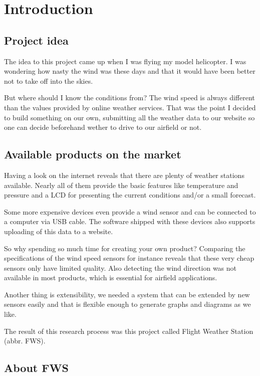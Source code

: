 
\chapter{Introduction}

\section{Project idea}
The idea to this project came up when I was flying my model helicopter. I was wondering how nasty the wind was these days and that it would have been better not to take off into the skies.

But where should I know the conditions from? The wind speed is always different than the values provided by online weather services. That was the point I decided to build something on our own, submitting all the weather data to our website so one can decide beforehand wether to drive to our airfield or not.

\section{Available products on the market}
Having a look on the internet reveals that there are plenty of weather stations available. Nearly all of them provide the basic features like temperature and pressure and a LCD for presenting the current conditions and/or a small forecast.

Some more expensive devices even provide a wind sensor and can be connected to a computer via USB cable. The software shipped with these devices also supports uploading of this data to a website.

So why spending so much time for creating your own product? Comparing the specifications of the wind speed sensors for instance reveals that these very cheap sensors only have limited quality. Also detecting the wind direction was not available in most products, which is essential for airfield applications.

Another thing is extensibility, we needed a system that can be extended by new sensors easily and that is flexible enough to generate graphs and diagrams as we like.

The result of this research process was this project called Flight Weather Station (abbr. FWS).

\section{About FWS} %
\label{sec:about_fws}

